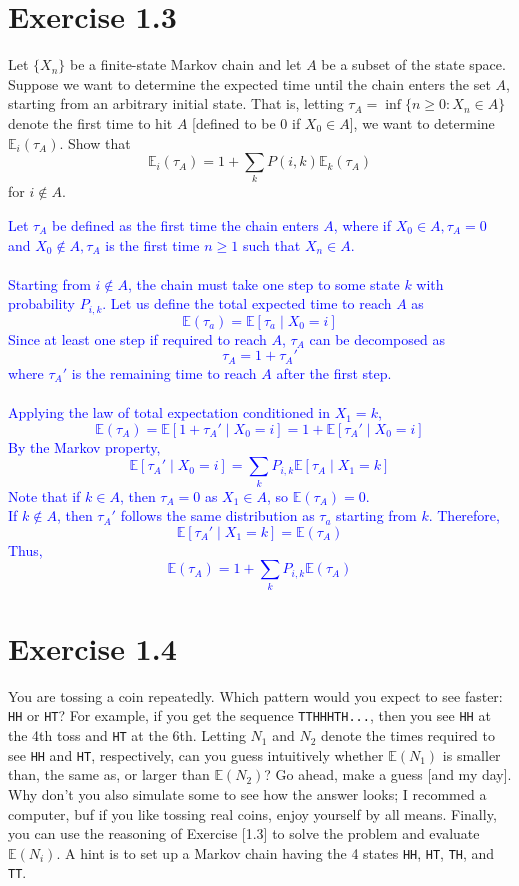 \documentclass{article}
\begin{document}
\section*{Exercise 1.3} 
Let $\{X_n\}$ be a finite-state Markov chain
and let $A$ be a subset of the state space. Suppose we want to
determine the expected time until the chain enters the set $A$,
starting from an arbitrary initial state. That is, letting $\tau_A =
\inf\{n \geq 0 : X_n \in A\}$ denote the first time to hit $A$
[defined to be $0$ if $X_0 \in A$], we want to determine
$\mathbb{E}_i(\tau_A)$. Show that \[ \mathbb{E}_i(\tau_A) = 1 + \sum_k P(i, k)
\mathbb{E}_k(\tau_A) \] for $i \notin A$.


\textcolor{blue}{Let $\tau_A$ be defined as the first time the chain enters $A$, where if $X_0\in A, \tau_A=0$ and $X_0\notin A, \tau_A$ is the first time $n \geq 1$ such that $X_n \in A$. \\ \\ Starting from $i\notin A$, the chain must take one step to some state $k$ with probability $P_{i,k}$. Let us define the total expected time to reach $A$ as $$\mathbb{E}(\tau_a)=\mathbb{E}[\tau_a \mid X_0=i]$$
Since at least one step if required to reach $A$, $\tau_A$ can be decomposed as $$\tau_A = 1 + \tau_A'$$ where $\tau_A'$ is the remaining time to reach $A$ after the first step. \\ \\
Applying the law of total expectation conditioned in $X_1=k$, $$\mathbb{E}(\tau_A)=\mathbb{E}[1+\tau_A' \mid X_0=i] = 1 + \mathbb{E}[\tau_A' \mid X_0 =i]$$
By the Markov property, $$\mathbb{E}[\tau_A' \mid  X_0=i] = \sum_k P_{i,k}\mathbb{E}[\tau_A \mid X_1=k]$$
Note that if $k\in A$, then $\tau_A=0$ as $X_1 \in A$, so $\mathbb{E}(\tau_A)=0$. \\ 
If $k\notin A$, then $\tau_A'$ follows the same distribution as $\tau_a$ starting from $k$. Therefore, $$\mathbb{E}[\tau_A' \mid X_1= k]=\mathbb{E}(\tau_A)$$
Thus, $$\mathbb{E}(\tau_A)=1+\sum_k P_{i,k}\mathbb{E}(\tau_A)$$}

\section*{Exercise 1.4} 
You are tossing a coin repeatedly. Which
pattern would you expect to see faster: \texttt{HH} or \texttt{HT}?
For example, if you get the sequence \texttt{TTHHHTH...}, then you
see \texttt{HH} at the 4th toss and \texttt{HT} at the 6th. Letting
$N_1$ and $N_2$ denote the times required to see \texttt{HH} and
\texttt{HT}, respectively, can you guess intuitively whether $\mathbb{E}(N_1)$
is smaller than, the same as, or larger than $\mathbb{E}(N_2)$? Go ahead, make
a guess [and my day]. Why don’t you also simulate some to see how the answer
looks; I recommed a computer, buf if you like tossing real coins, enjoy yourself by all means. Finally, you can use the reasoning of Exercise [1.3] to solve the
problem and evaluate $\mathbb{E}(N_i)$. A hint is to set up a Markov chain
having the 4 states \texttt{HH}, \texttt{HT}, \texttt{TH}, and
\texttt{TT}.
\end{document}
